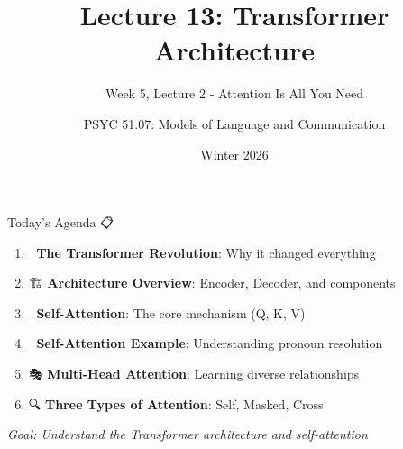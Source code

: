 \documentclass[aspectratio=169]{beamer}
\title{Lecture 13: Transformer Architecture}
\subtitle{Week 5, Lecture 2 - Attention Is All You Need}
\author{PSYC 51.07: Models of Language and Communication}
\date{Winter 2026}
\begin{document}
\begin{frame}[shrink=10]
\titlepage
\end{frame}

\begin{frame}[shrink=10]{Today's Agenda 📋}
\large
\begin{enumerate}\setlength{\itemsep}{0pt}
    \item 🤖 \textbf{The Transformer Revolution}: Why it changed everything
    \item 🏗️ \textbf{Architecture Overview}: Encoder, Decoder, and components
    \item 🎯 \textbf{Self-Attention}: The core mechanism (Q, K, V)
    \item 📝 \textbf{Self-Attention Example}: Understanding pronoun resolution
    \item 🎭 \textbf{Multi-Head Attention}: Learning diverse relationships
    \item 🔍 \textbf{Three Types of Attention}: Self, Masked, Cross
\end{enumerate}

\vspace{1em}
\textit{Goal: Understand the Transformer architecture and self-attention}
\end{frame}
\end{document}
